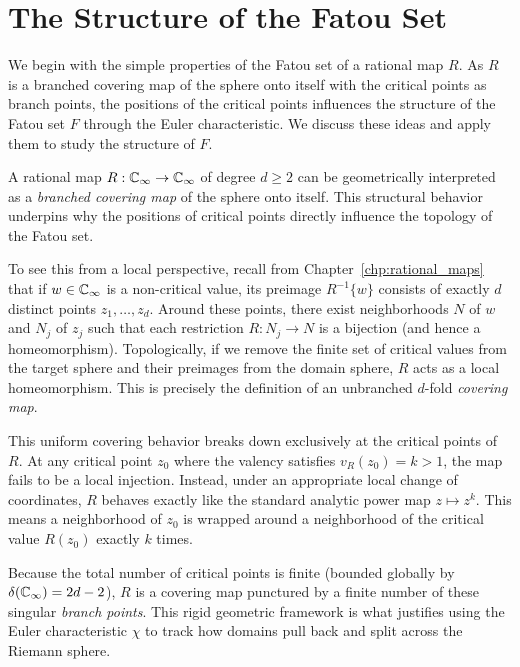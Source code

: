 \chapter{The Structure of the Fatou Set}
\label{chp:the_structure_of_the_Fatou_set}

We begin with the simple properties of the Fatou set of a rational map $R$. As
$R$ is a branched covering map of the sphere onto itself with the critical
points as branch points, the positions of the critical points influences the
structure of the Fatou set $F$ through the Euler characteristic. We discuss
these ideas and apply them to study the structure of $F$.

\begin{remark}
    A rational map $R: \mathbb{C}_\infty \to \mathbb{C}_\infty$ of degree $d \geq 2$ can be
    geometrically interpreted as a \emph{branched covering map} of the sphere
    onto itself. This structural behavior underpins why the positions of
    critical points directly influence the topology of the Fatou set.
    
    To see this from a local perspective, recall from
    Chapter~\ref{chp:rational_maps} that if $w \in \mathbb{C}_\infty$ is a non-critical
    value, its preimage $R^{-1}\{w\}$ consists of exactly $d$ distinct points
    $z_1, \dots, z_d$. Around these points, there exist neighborhoods $N$ of $w$
    and $N_j$ of $z_j$ such that each restriction $R: N_j \to N$ is a bijection
    (and hence a homeomorphism). Topologically, if we remove the finite set of
    critical values from the target sphere and their preimages from the domain
    sphere, $R$ acts as a local homeomorphism. This is precisely the definition
    of an unbranched $d$-fold \emph{covering map}.
    
    This uniform covering behavior breaks down exclusively at the critical
    points of $R$. At any critical point $z_0$ where the valency satisfies
    $v_R(z_0) = k > 1$, the map fails to be a local injection. Instead, under an
    appropriate local change of coordinates, $R$ behaves exactly like the
    standard analytic power map $z \mapsto z^k$. This means a neighborhood of
    $z_0$ is wrapped around a neighborhood of the critical value $R(z_0)$
    exactly $k$ times.
    
    Because the total number of critical points is finite (bounded globally by
    $\delta(\mathbb{C}_\infty) = 2d - 2$), $R$ is a covering map punctured by a finite
    number of these singular \emph{branch points}. This rigid geometric
    framework is what justifies using the Euler characteristic $\chi$ to track
    how domains pull back and split across the Riemann sphere.
\end{remark}

